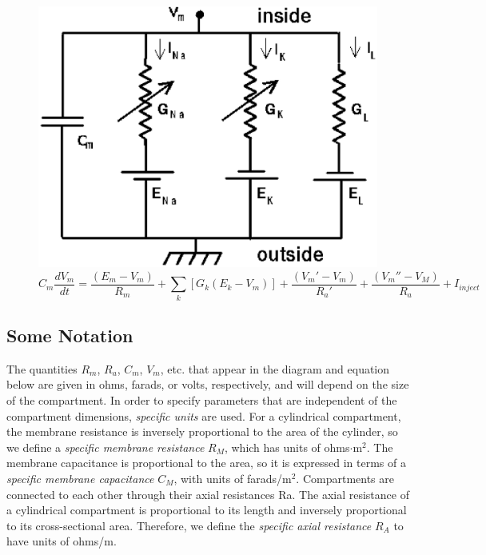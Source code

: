 \documentclass[12pt]{article}
\begin{document}
\begin{figure}[h]
  \centering
 \includegraphics[scale=0.5]{figs/HHcompt.eps}
  \label{fig:dendrite}
  \begin{displaymath}
		C_m \frac{dV_m}{dt} = \frac{(E_m-V_m)}{R_m}+\sum_k [G_k(E_k-V_m)]+\frac{(V_m'-V_m)}{R_a'} + \frac{(V_m''-V_M)}{R_a} +I_{inject}
\label{eq:figeq1}		
\end{displaymath}
\end{figure}

\subsection*{Some Notation}

The quantities $R_m$, $R_a$, $C_m$, $V_m$, etc. that appear in the diagram and equation below are given in ohms, farads, or volts, respectively, and will depend on the size of the compartment. In order to specify parameters that are independent of the compartment dimensions, {\it specific units} are used. For a cylindrical compartment, the membrane resistance is inversely proportional to the area of the cylinder, so we define a {\it specific membrane resistance} $R_M$, which has units of ohms$\cdot$m$^2$. The membrane capacitance is proportional to the area, so it is expressed in terms of a {\it specific membrane capacitance} $C_M$, with units of farads/m$^2$. Compartments are connected to each other through their axial resistances Ra. The axial resistance of a cylindrical compartment is proportional to its length and inversely proportional to its cross-sectional area. Therefore, we define the {\it specific axial resistance} $R_A$ to have units of ohms/m.
\end{document}
